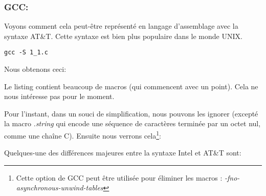 \subsubsection{GCC: \ATTSyntax}
\label{ATT_syntax}

Voyons comment cela peut-être représenté en langage d'assemblage avec la syntaxe AT\&T.
Cette syntaxe est bien plus populaire dans le monde UNIX.

\begin{lstlisting}[caption=compilons avec GCC 4.7.3]
gcc -S 1_1.c
\end{lstlisting}

Nous obtenons ceci:



Le listing contient beaucoup de macros (qui commencent avec un point). Cela ne nous intéresse pas pour le moment.

Pour l'instant, dans un souci de simplification, nous pouvons les ignorer (excepté la macro \emph{.string}
qui encode une séquence de caractères terminée par un octet nul, comme une chaîne C).
Ensuite nous verrons cela\footnote{Cette option de GCC peut être utilisée pour éliminer les macros :
\emph{-fno-asynchronous-unwind-tables}}:



\myindex{\ATTSyntax}
\myindex{\IntelSyntax}
Quelques-une des différences majeures entre la syntaxe Intel et AT\&T sont:

